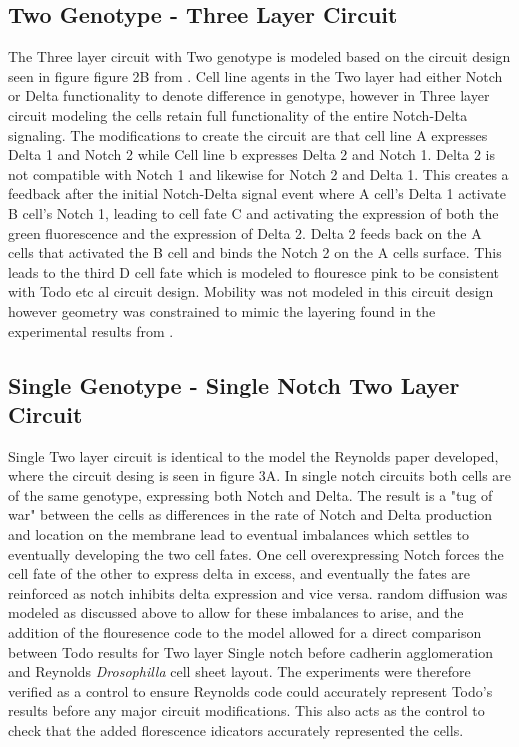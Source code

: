 \documentclass[12pt]{ifacconf}
\begin{document}
\subsection{Two Genotype - Three Layer Circuit}

The Three layer circuit with Two genotype is modeled based on the circuit design seen in figure figure 2B from \cite{TP:18}. Cell line agents in the Two layer had either Notch or Delta functionality to denote difference in genotype, however in Three layer circuit modeling the cells retain full functionality of the entire Notch-Delta signaling. The modifications to create the circuit are that cell line A expresses Delta 1 and Notch 2 while Cell line b expresses Delta 2 and Notch 1. Delta 2 is not compatible with Notch 1 and likewise for Notch 2 and Delta 1. This creates a feedback after the initial Notch-Delta signal event where A cell's Delta 1 activate B cell's Notch 1, leading to cell fate C and activating the expression of both the green fluorescence and the expression of Delta 2. Delta 2 feeds back on the A cells that activated the B cell and binds the Notch 2 on the A cells surface. This leads to the third D cell fate which is modeled to flouresce pink to be consistent with Todo etc al circuit design. Mobility was not modeled in this circuit design however geometry was constrained to mimic the layering found in the experimental results from \cite{TP:18}. 


\subsection{Single Genotype - Single Notch Two Layer Circuit}

Single Two layer circuit is identical to the model the Reynolds paper developed, where the circuit desing is seen in figure 3A. In single notch circuits both cells are of the same genotype, expressing both Notch and Delta. The result is a "tug of war" between the cells as differences in the rate of Notch and Delta production and location on the membrane lead to eventual imbalances which settles to eventually developing the two cell fates. One cell overexpressing Notch forces the cell fate of the other to express delta in excess, and eventually the fates are reinforced as notch inhibits delta expression and vice versa. random diffusion was modeled as discussed above to allow for these imbalances to arise, and the addition of the flouresence code to the model allowed for a direct comparison between Todo results for Two layer Single notch before cadherin agglomeration and Reynolds \emph{Drosophilla} cell sheet layout. The experiments were therefore verified as a control to ensure Reynolds code could accurately represent Todo's results before any major circuit modifications. This also acts as the control to check that the added florescence idicators accurately represented the cells. 
\end{document}

